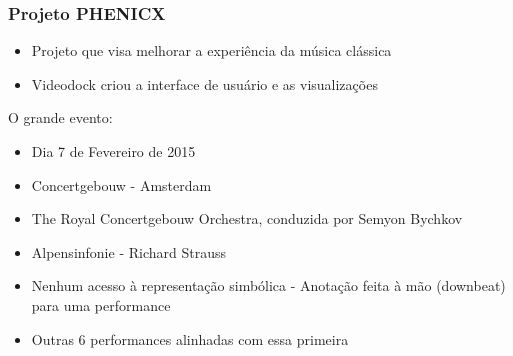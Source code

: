 \begin{frame}
  \frametitle{Projeto PHENICX}
  \begin{itemize}
    \item Projeto que visa melhorar a experiência da música clássica\pause
    \item Videodock criou a interface de usuário e as visualizações \pause
  \end{itemize}
  O grande evento: \pause
  \begin{itemize}
    \item Dia 7 de Fevereiro de 2015
    \item Concertgebouw - Amsterdam
    \item The Royal Concertgebouw Orchestra, conduzida por Semyon Bychkov
    \item Alpensinfonie - Richard Strauss
    \item Nenhum acesso à representação simbólica - Anotação feita à mão (downbeat) para uma performance
    \item Outras 6 performances alinhadas com essa primeira
  \end{itemize}
\end{frame}

